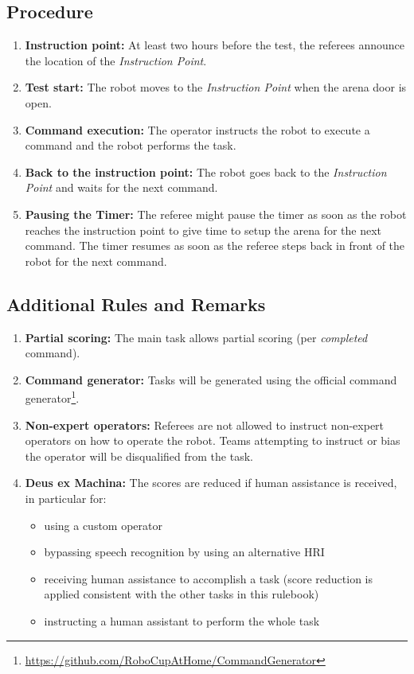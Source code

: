 \subsection*{Procedure}
\begin{enumerate}[nosep]
	\item \textbf{Instruction point:} At least two hours before the test, the referees announce the location of the \textit{Instruction Point}.
	\item \textbf{Test start:} The robot moves to the \textit{Instruction Point} when the arena door is open.
	\item \textbf{Command execution:} The operator instructs the robot to execute a command and the robot performs the task.
	\item \textbf{Back to the instruction point:} The robot goes back to the \textit{Instruction Point} and waits for the next command.
	\item \textbf{Pausing the Timer:} The referee might pause the timer as soon as the robot reaches the instruction point to give time to setup the arena for the next command. The timer resumes as soon as the referee steps back in front of the robot for the next command.
\end{enumerate}


\subsection*{Additional Rules and Remarks}
\begin{enumerate}[nosep]
	\item \textbf{Partial scoring:} The main task allows partial scoring (per \emph{completed} command).

	\item \textbf{Command generator:} Tasks will be generated using the official command generator\footnote{\url{https://github.com/RoboCupAtHome/CommandGenerator}}.

	\item \textbf{Non-expert operators:} Referees are not allowed to instruct non-expert operators on how to operate the robot.
	Teams attempting to instruct or bias the operator will be disqualified from the task.

	\item \textbf{Deus ex Machina:} The scores are reduced if human assistance is received, in particular for:
	\begin{itemize}
		\item using a custom operator
		\item bypassing speech recognition by using an alternative HRI
		\item receiving human assistance to accomplish a task (score reduction is applied consistent with the other tasks in this rulebook)
		\item instructing a human assistant to perform the whole task
	\end{itemize}
\end{enumerate}

